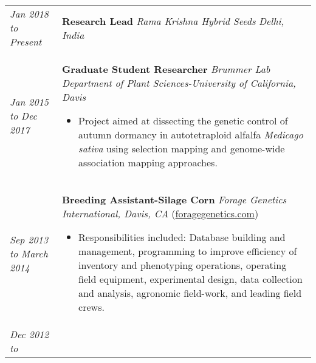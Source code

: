 ﻿\documentclass[a4paper]{article}
\begin{document}
\begin{tabular}{p{3cm} p{14cm}}
\textit{Jan 2018}\newline
\textit{to}\newline
\textit{Present}\newline
& 
\textbf{Research Lead}\newline
\textit{Rama Krishna Hybrid Seeds}\newline
\textit{Delhi, India}
%
\\
%
\vspace{0pt} 
\textit{Jan 2015}\newline
\textit{to}\newline
\textit{Dec 2017}\newline
& 
\vspace{0pt}
\textbf{Graduate Student Researcher}\newline
\textit{Brummer Lab}\newline
\textit{Department of Plant Sciences-University of California, Davis}
\begin{itemize}[noitemsep,topsep=0pt]
  \item Project aimed at dissecting the genetic control of autumn dormancy in autotetraploid alfalfa \textit{Medicago sativa} using selection mapping and genome-wide association mapping approaches.
\end{itemize}
%
\\
%
\vspace{0pt} 
\textit{Sep 2013}\newline
\textit{to}\newline
\textit{March 2014}\newline
& 
\vspace{0pt}
\textbf{Breeding Assistant-Silage Corn}\newline
\textit{Forage Genetics International, Davis, CA} (\href{http://www.foragegenetics.com/}{foragegenetics.com})
\begin{itemize}[noitemsep,topsep=0pt]
  \item Responsibilities included: Database building and management, programming to improve efficiency of inventory and phenotyping operations, operating field equipment, experimental design, data collection and analysis, agronomic field-work, and leading field crews.
\end{itemize}
%
\\
%
\vspace{0pt} 
\textit{Dec 2012}\newline
\textit{to}\newline

\end{tabular}
\end{document}

